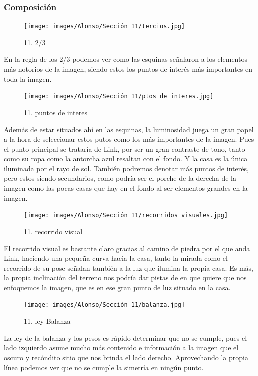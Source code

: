 \documentclass[12pt]{article}
\begin{document}
        \subsubsection{Composición}
        \begin{figure}[H]
      \centering
      \texttt{[image: images/Alonso/Sección 11/tercios.jpg]}
      \caption{\small 11. 2/3}
    \end{figure}
     En la regla de los 2/3  podemos ver como las esquinas señalaron a los elementos más notorios de la imagen, siendo estos los puntos de interés más importantes en toda la imagen.

    \begin{figure}[H]
      \centering
      \texttt{[image: images/Alonso/Sección 11/ptos de interes.jpg]}
      \caption{\small 11. puntos de interes}
    \end{figure}
    Además de estar situados ahí en las esquinas, la luminosidad juega un gran papel a la hora de seleccionar estos putos como los más importantes de la imagen. Pues el punto principal se trataría de Link, por ser un gran contraste de tono, tanto como su ropa como la antorcha azul resaltan con el fondo. Y la casa es la única iluminada por el rayo de sol.
    También podremos denotar más puntos de interés, pero estos siendo secundarios, como podría ser el porche de la derecha de la imagen como las pocas casas que hay en el fondo al ser elementos grandes en la imagen.

    \begin{figure}[H]
      \centering
      \texttt{[image: images/Alonso/Sección 11/recorridos visuales.jpg]}
      \caption{\small 11. recorrido visual}
    \end{figure}
    El recorrido visual es bastante claro gracias al camino de piedra por el que anda Link, haciendo una pequeña curva hacia la casa, tanto la mirada como el recorrido de su pose señalan también a la luz que ilumina la propia casa. Es más, la propia inclinación del terreno nos podría dar pistas de en que quiere que nos enfoquemos la imagen, que es en ese gran punto de luz situado en la casa.

\begin{figure}[H]
      \centering
      \texttt{[image: images/Alonso/Sección 11/balanza.jpg]}
      \caption{\small 11. ley Balanza}
    \end{figure}
    La ley de la balanza y los pesos es rápido determinar que no se cumple, pues el lado izquierdo asume mucho más contenido e información a la imagen que el oscuro y recóndito sitio que nos brinda el lado derecho. Aprovechando la propia línea podemos ver que no se cumple la simetría en ningún punto.
\end{document}
